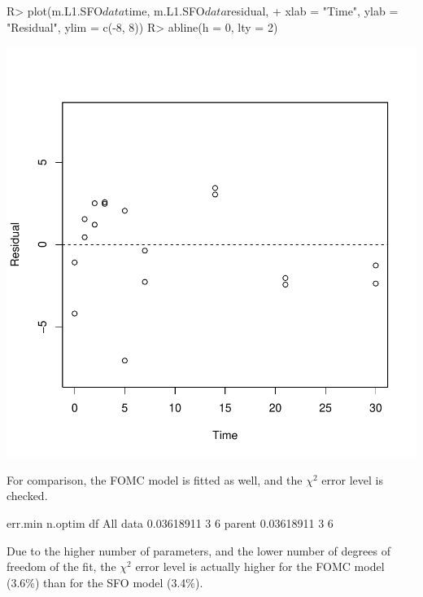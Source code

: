 \documentclass[12pt,a4paper]{article}
\begin{document}
\begin{Schunk}
\begin{Sinput}
R> plot(m.L1.SFO$data$time, m.L1.SFO$data$residual,
+   xlab = "Time", ylab = "Residual", ylim = c(-8, 8))
R> abline(h = 0, lty = 2)
\end{Sinput}
\end{Schunk}
\includegraphics{examples-L1_SFO_residuals}

For comparison, the FOMC model is fitted as well, and the $\chi^2$ error level
is checked.

\begin{Schunk}
\begin{Soutput}
            err.min n.optim df
All data 0.03618911       3  6
parent   0.03618911       3  6
\end{Soutput}
\end{Schunk}

Due to the higher number of parameters, and the lower number of degrees of freedom
of the fit, the $\chi^2$ error level is actually higher for the FOMC model (3.6\%) than 
for the SFO model (3.4\%).
\end{document}
